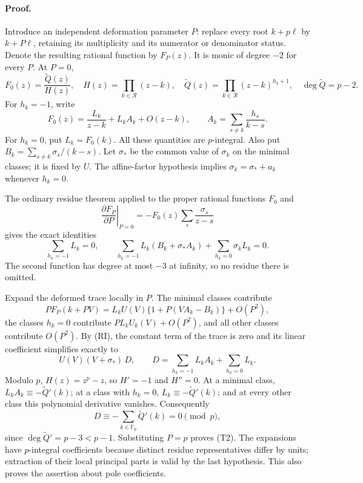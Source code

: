 \documentclass[11pt]{article}
\begin{document}
\paragraph{Proof.}
Introduce an independent deformation parameter $P$: replace every root
$k+p\ell$ by $k+P\ell$, retaining its multiplicity and its numerator or
denominator status.  Denote the resulting rational function by $F_P(z)$.
It is monic of degree $-2$ for every $P$.  At $P=0$,
\[
 F_0(z)=\frac{\widetilde Q(z)}{H(z)},\quad
 H(z)=\prod_{k\in\mathcal R}(z-k),\quad
 \widetilde Q(z)=\prod_{k\in\mathcal R}(z-k)^{h_k+1},
 \quad\deg\widetilde Q=p-2.
\]
For $h_k=-1$, write
\[
 F_0(z)=\frac{L_k}{z-k}+L_k A_k+O(z-k),\qquad
 A_k=\sum_{s\ne k}\frac{h_s}{k-s}.
\]
For $h_k=0$, put $L_k=F_0(k)$.  All these quantities are $p$-integral.
Also put $B_k=\sum_{s\ne k}\sigma_s/(k-s)$.
Let $\sigma_*$ be the common value of $\sigma_k$ on the minimal classes;
it is fixed by $U$.  The affine-factor hypothesis implies
$\sigma_k=\sigma_*+a_k$ whenever $h_k=0$.

The ordinary residue theorem applied to the proper rational functions
$F_0$ and
\[
 \left.\frac{\partial F_P}{\partial P}\right|_{P=0}
       =-F_0(z)\sum_s\frac{\sigma_s}{z-s}
\]
gives the exact identities
\[
 \sum_{h_k=-1}L_k=0,\qquad
 \sum_{h_k=-1}L_k(B_k+\sigma_*A_k)
       +\sum_{h_k=0}\sigma_kL_k=0.                    \tag{RI}
\]
The second function has degree at most $-3$ at infinity, so no residue
there is omitted.

Expand the deformed trace locally in $P$.  The minimal classes contribute
\[
 P F_P(k+PV)=L_kU(V)\{1+P(VA_k-B_k)\}+O(P^2),
\]
the classes $h_k=0$ contribute $P L_kU_k(V)+O(P^2)$, and all other classes
contribute $O(P^2)$.  By (RI), the constant term of the trace is zero and
its linear coefficient simplifies exactly to
\[
 U(V)(V+\sigma_*)\,D,\qquad
 D=\sum_{h_k=-1}L_kA_k+\sum_{h_k=0}L_k.                 \tag{D}
\]
Modulo $p$, $H(z)=z^p-z$, so $H'=-1$ and $H''=0$.
At a minimal class, $L_kA_k\equiv-\widetilde Q'(k)$; at a class with
$h_k=0$, $L_k\equiv-\widetilde Q'(k)$; and at every other class this
polynomial derivative vanishes.  Consequently
\[
 D\equiv-\sum_{k\in\mathbb F_p}\widetilde Q'(k)=0\pmod p,
\]
since $\deg\widetilde Q'=p-3<p-1$.
Substituting $P=p$ proves (T2).  The expansions have $p$-integral
coefficients because distinct residue representatives differ by units;
extraction of their local principal parts is valid by the last hypothesis.
This also proves the assertion about pole coefficients.
\end{document}
